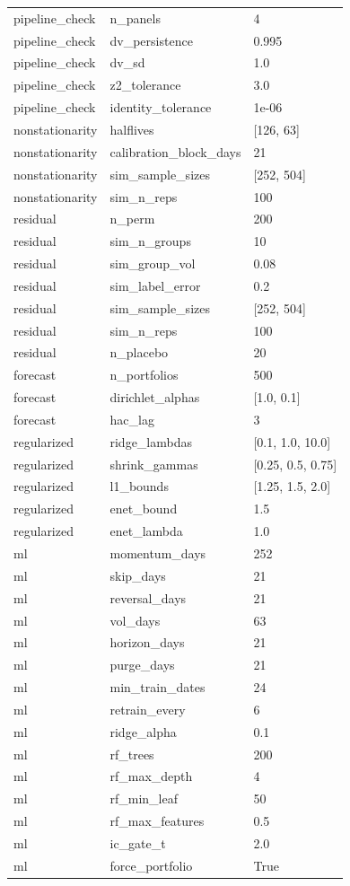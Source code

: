 \begin{table}[t]
{\begin{tabular}{lll}
pipeline\_check & n\_panels & 4 \\
pipeline\_check & dv\_persistence & 0.995 \\
pipeline\_check & dv\_sd & 1.0 \\
pipeline\_check & z2\_tolerance & 3.0 \\
pipeline\_check & identity\_tolerance & 1e-06 \\
nonstationarity & halflives & [126, 63] \\
nonstationarity & calibration\_block\_days & 21 \\
nonstationarity & sim\_sample\_sizes & [252, 504] \\
nonstationarity & sim\_n\_reps & 100 \\
residual & n\_perm & 200 \\
residual & sim\_n\_groups & 10 \\
residual & sim\_group\_vol & 0.08 \\
residual & sim\_label\_error & 0.2 \\
residual & sim\_sample\_sizes & [252, 504] \\
residual & sim\_n\_reps & 100 \\
residual & n\_placebo & 20 \\
forecast & n\_portfolios & 500 \\
forecast & dirichlet\_alphas & [1.0, 0.1] \\
forecast & hac\_lag & 3 \\
regularized & ridge\_lambdas & [0.1, 1.0, 10.0] \\
regularized & shrink\_gammas & [0.25, 0.5, 0.75] \\
regularized & l1\_bounds & [1.25, 1.5, 2.0] \\
regularized & enet\_bound & 1.5 \\
regularized & enet\_lambda & 1.0 \\
ml & momentum\_days & 252 \\
ml & skip\_days & 21 \\
ml & reversal\_days & 21 \\
ml & vol\_days & 63 \\
ml & horizon\_days & 21 \\
ml & purge\_days & 21 \\
ml & min\_train\_dates & 24 \\
ml & retrain\_every & 6 \\
ml & ridge\_alpha & 0.1 \\
ml & rf\_trees & 200 \\
ml & rf\_max\_depth & 4 \\
ml & rf\_min\_leaf & 50 \\
ml & rf\_max\_features & 0.5 \\
ml & ic\_gate\_t & 2.0 \\
ml & force\_portfolio & True \\
\bottomrule
\end{tabular}}
\end{table}
